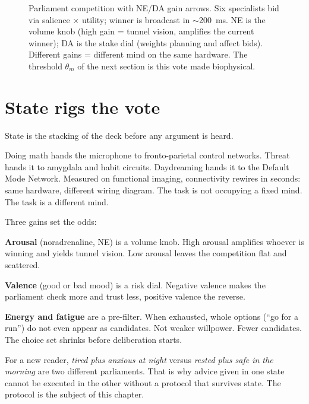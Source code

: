 \begin{figure}[h]
\caption{Parliament competition with NE/DA gain arrows. Six specialists bid via salience $\times$ utility; winner is broadcast in $\sim$200~ms. NE is the volume knob (high gain = tunnel vision, amplifies the current winner); DA is the stake dial (weights planning and affect bids). Different gains = different mind on the same hardware. The threshold $\theta_m$ of the next section is this vote made biophysical.}
\label{fig:parliament-ch8}
\end{figure}

\section{State rigs the vote}

State is the stacking of the deck before any argument is heard.

Doing math hands the microphone to fronto-parietal control networks. Threat hands it to amygdala and habit circuits. Daydreaming hands it to the Default Mode Network. Measured on functional imaging, connectivity rewires in seconds: same hardware, different wiring diagram. The task is not occupying a fixed mind. The task is a different mind.

Three gains set the odds:

\textbf{Arousal} (noradrenaline, NE) is a volume knob. High arousal amplifies whoever is winning and yields tunnel vision. Low arousal leaves the competition flat and scattered.

\textbf{Valence} (good or bad mood) is a risk dial. Negative valence makes the parliament check more and trust less, positive valence the reverse.

\textbf{Energy and fatigue} are a pre-filter. When exhausted, whole options (``go for a run'') do not even appear as candidates. Not weaker willpower. Fewer candidates. The choice set shrinks before deliberation starts.

For a new reader, \textit{tired plus anxious at night} versus \textit{rested plus safe in the morning} are two different parliaments. That is why advice given in one state cannot be executed in the other without a protocol that survives state. The protocol is the subject of this chapter.

